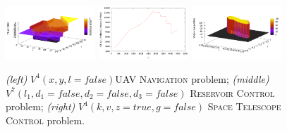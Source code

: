 ﻿%
\begin{figure}[tbp!]
\centering
\includegraphics[width=0.30\textwidth]{Figures/uavV4.pdf}
\includegraphics[width=0.30\textwidth]{Figures/reserV7.pdf}
\includegraphics[width=0.30\textwidth]{Figures/telesV4.pdf}
\vspace{-2mm}
\caption{\footnotesize
{\it (left)}  $V^4(x,y,l=false)$\textsc{UAV Navigation} problem;
{\it (middle)} $V^7(l_1,d_1=false,d_2=false,d_3=false)$ \textsc{Reservoir Control} problem;
{\it (right)} $V^4(k,v,z=true,g=false)$ \textsc{Space Telescope Control} problem.
}
\label{fig:Value}
\vspace{-5mm}
\end{figure}


